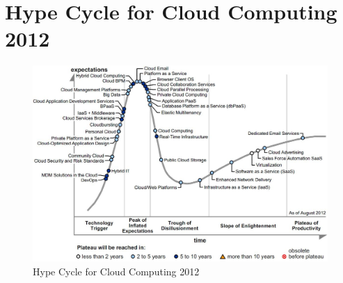 \chapter{Hype Cycle for Cloud Computing 2012}\label{ch:app03}

\begin{figure}[htb]
	\centering
	\includegraphics[width=\textwidth]{gfx/cloudCycle}
	\caption[Hype Cycle for Cloud Computing 2012]{Hype Cycle for Cloud Computing 2012 \citep[p. 5]{Smith2012}}
	\label{fig:cloudCycle}
\end{figure}